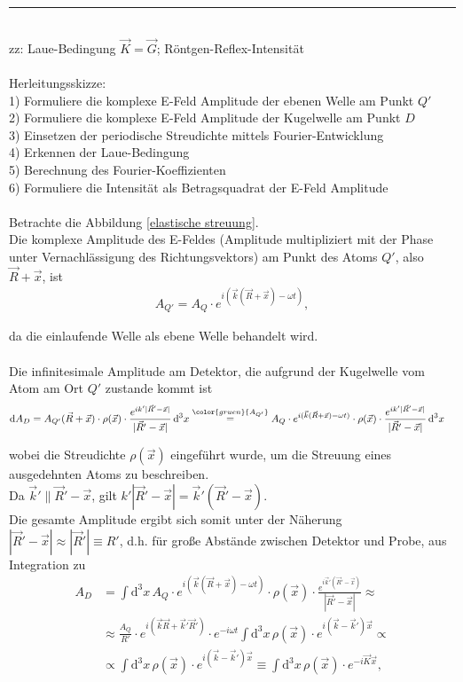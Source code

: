 \documentclass{article}
\newcommand{\diff}{\mathrm{d}}
\newcommand{\comment}[1]{{\color{gruen}{#1}}}
\begin{document}
{\color{violet}
\hrule
	\\
	zz: Laue-Bedingung $\vec{K}=\vec{G}$; Röntgen-Reflex-Intensität\\
	\\
	Herleitungsskizze:\\
	1) Formuliere die komplexe E-Feld Amplitude der ebenen Welle am Punkt $Q'$\\
	2) Formuliere die komplexe E-Feld Amplitude der Kugelwelle am Punkt $D$\\
	3) Einsetzen der periodische Streudichte mittels Fourier-Entwicklung\\
	4) Erkennen der Laue-Bedingung\\
	5) Berechnung des Fourier-Koeffizienten\\
	6) Formuliere die Intensität als Betragsquadrat der E-Feld Amplitude\\
	\\
	Betrachte die Abbildung \ref{elastische streuung}.\\
	Die komplexe Amplitude des E-Feldes (Amplitude multipliziert mit der Phase unter Vernachlässigung des Richtungsvektors) am Punkt des Atoms $Q'$, also $\vec{R}+\vec{x}$, ist
		\begin{align*}
			A_{Q'} = A_Q \cdot e^{i(\vec{k}(\vec{R}+\vec{x}) - \omega t)},
		\end{align*}
	
	da die einlaufende Welle als ebene Welle behandelt wird.\\
	\\
	Die infinitesimale Amplitude am Detektor, die aufgrund der Kugelwelle vom Atom am Ort $Q'$ zustande kommt ist
		\begin{align*}
			\diff A_D &= A_{Q'}(\vec{R}+\vec{x}) \cdot \rho(\vec{x}) \cdot \frac{ e^{i k' |\vec{R}'-\vec{x}|} }{ |\vec{R}' - \vec{x}| } \, \diff^3x \stackrel{\comment{A_{Q'}}}{=} A_Q \cdot e^{i(\vec{k}(\vec{R}+\vec{x}) - \omega t)} \cdot \rho(\vec{x}) \cdot \frac{ e^{i k' |\vec{R}'-\vec{x}|} }{ |\vec{R}' - \vec{x}| } \, \diff^3x
		\end{align*}	

	wobei die Streudichte $\rho(\vec{x})$ eingeführt wurde, um die Streuung eines ausgedehnten Atoms zu beschreiben.\\
	Da $\vec{k}' \parallel \vec{R}'-\vec{x}$, gilt $k' |\vec{R}'-\vec{x}| = \vec{k}'(\vec{R}'-\vec{x})$.\\
	Die gesamte Amplitude ergibt sich somit unter der Näherung $|\vec{R}'-\vec{x}| \approx |\vec{R}'| \equiv R'$, d.h. für große Abstände zwischen Detektor und Probe, aus Integration zu
		\begin{align*}
			A_D &= \int \diff^3 x \, A_Q \cdot e^{i(\vec{k}(\vec{R}+\vec{x}) - \omega t)} \cdot \rho(\vec{x}) \cdot \frac{ e^{i \vec{k}' (\vec{R}'-\vec{x})} }{ |\vec{R}' - \vec{x}| } \approx \\
			&\approx \frac{A_Q}{R'} \cdot e^{i(\vec{k}\vec{R}+\vec{k}'\vec{R}')} \cdot e^{-i\omega t} \int \diff^3x \, \rho(\vec{x}) \cdot e^{i(\vec{k}-\vec{k}')\vec{x}} \propto \\
			&\propto \int \diff^3x \, \rho(\vec{x}) \cdot e^{i(\vec{k}-\vec{k}')\vec{x}} \equiv \int \diff^3x \, \rho(\vec{x}) \cdot e^{-i\vec{K}\vec{x}},
		\end{align*}
	
}
\end{document}
